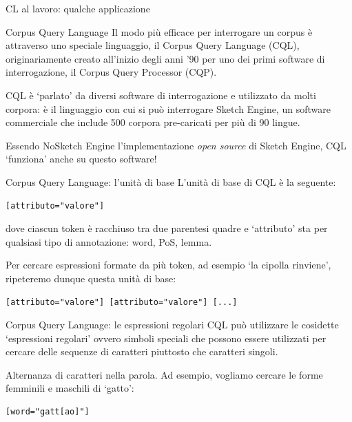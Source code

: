 \documentclass[pdf]{prosper}
\begin{document}
\begin{tsectionandpart}{CL al lavoro: qualche applicazione}
\begin{slide}{Corpus Query Language}
Il modo più efficace per interrogare un corpus è attraverso uno speciale linguaggio, il Corpus Query Language (CQL), originariamente creato all'inizio degli anni '90 per uno dei primi software di interrogazione, il Corpus Query Processor (CQP).

CQL è `parlato' da diversi software di interrogazione e utilizzato da molti corpora: è il linguaggio con cui si può interrogare Sketch Engine, un software commerciale che include 500 corpora pre-caricati per più di 90 lingue. 
	
Essendo NoSketch Engine l'implementazione {\it open source} di Sketch Engine, CQL `funziona' anche su questo software!

\end{slide}

\begin{slide}{Corpus Query Language: l'unità di base}
L'unità di base di CQL è la seguente:

\begin{center}
\begin{verbatim}
[attributo="valore"]
\end{verbatim}
\end{center}

dove ciascun token è racchiuso tra due parentesi quadre e `attributo' sta per qualsiasi tipo di annotazione: word, PoS, lemma.

Per cercare espressioni formate da più token, ad esempio `la cipolla rinviene', ripeteremo dunque questa unità di base:

\begin{center}
\begin{verbatim}
[attributo="valore"] [attributo="valore"] [...]
\end{verbatim}
\end{center}

\end{slide}

\begin{slide}{Corpus Query Language: le espressioni regolari}
CQL può utilizzare le cosidette `espressioni regolari' ovvero simboli speciali che possono essere utilizzati per cercare delle sequenze di caratteri piuttosto che caratteri singoli.

Alternanza di caratteri nella parola. Ad esempio, vogliamo cercare le forme femminili e maschili di `gatto':

\begin{center}
\begin{verbatim}
[word="gatt[ao]"]
\end{verbatim}
\end{center}


\end{slide}
\end{tsectionandpart}
\end{document}
